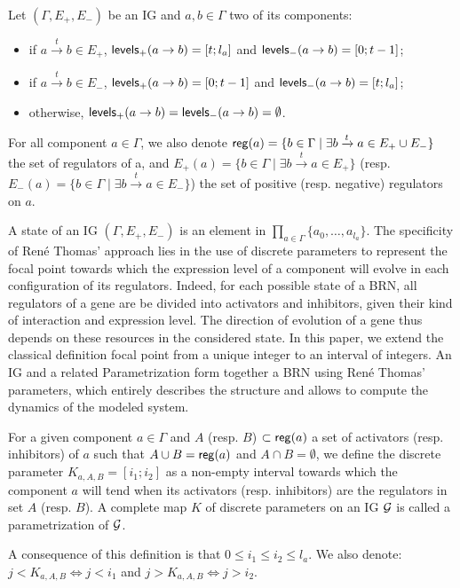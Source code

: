 \begin{definition}\label{def:levels}
Let $(\Gamma,E_+,E_-)$ be an IG and $a, b \in \Gamma$ two of its components:
\begin{itemize}
  \item if $a \xrightarrow{t} b \in E_+$, $\mathsf{levels}_+(a\rightarrow b) = [t; l_a]$ and
    $\mathsf{levels}_-(a\rightarrow b) = [0; t-1]$;
  \item if $a \xrightarrow{t} b \in E_-$, $\mathsf{levels}_+(a\rightarrow b) = [0; t-1]$ and
    $\mathsf{levels}_-(a\rightarrow b) = [t; l_a]$;
  \item otherwise, $\mathsf{levels}_+(a\rightarrow b) = \mathsf{levels}_-(a\rightarrow b) = \emptyset$.
\end{itemize}
\end{definition}

For all component $a \in \Gamma$, we also denote $\mathsf{reg}({a}) = \{b \in \Gamma \mid \exists b \xrightarrow{t} a \in E_+ \cup E_-\}$ the set of regulators of a,
and $E_+(a) = \{b \in \Gamma \mid \exists b \xrightarrow{t} a \in E_+\}$ (resp. $E_-(a) = \{b \in \Gamma \mid \exists b \xrightarrow{t} a \in E_-\}$) the set of positive (resp. negative) regulators on $a$.


A state of an IG $(\Gamma, E_+, E_-)$ is an element in $\prod_{a \in \Gamma} \{a_0, \dots, a_{l_a}\}$.
The specificity of René Thomas' approach lies in the use of discrete parameters to represent the focal point towards which the expression level of a component will evolve in each configuration of its regulators.
Indeed, for each possible state of a BRN, all regulators of a gene are be divided into activators and inhibitors, given their kind of interaction and expression level.
The direction of evolution of a gene thus depends on these resources in the considered state.
In this paper, we extend the classical definition focal point from a unique integer to an interval of integers.
An IG and a related Parametrization form together a BRN using René Thomas' parameters, which entirely describes the structure and allows to compute the dynamics of the modeled system.

\begin{definition}\label{def:param}
For a given component $a \in \Gamma$ and $A$ (resp. $B$) $\subset \mathsf{reg}({a})$ a set of activators (resp. inhibitors) of $a$ such that
$A \cup B = \mathsf{reg}({a})$ and $A \cap B = \emptyset$,
we define the discrete parameter $K_{a,A,B} = [i_1; i_2]$ as a non-empty interval towards which the component $a$ will tend
when its activators (resp. inhibitors) are the regulators in set $A$ (resp. $B$).
A complete map $K$ of discrete parameters on an IG $\mathcal{G}$ is called a parametrization of $\mathcal{G}$.
\end{definition}
A consequence of this definition is that $0 \leq i_1 \leq i_2 \leq l_a$.
We also denote: $j < K_{a,A,B} \Leftrightarrow j < i_1$ and $j > K_{a,A,B} \Leftrightarrow j> i_2$.

